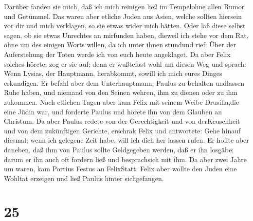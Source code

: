Darüber fanden sie mich, daß ich mich reinigen ließ im Tempelohne allen
Rumor und Getümmel.  Das waren aber etliche Juden aus
Asien, welche sollten hiersein vor dir und mich verklagen, so sie etwas
wider mich hätten.  Oder laß diese selbst sagen, ob sie
etwas Unrechtes an mirfunden haben, dieweil ich stehe vor dem Rat,
 ohne um des einigen Worts willen, da ich unter ihnen
stundund rief: Über der Auferstehung der Toten werde ich von euch heute
angeklaget.  Da aber Felix solches hörete; zog er sie auf;
denn er wußtefast wohl um diesen Weg und sprach: Wenn Lysias, der
Hauptmann, herabkommt, sowill ich mich eures Dinges erkundigen.
 Er befahl aber dem Unterhauptmann, Paulus zu behalten
undlassen Ruhe haben, und niemand von den Seinen wehren, ihm zu dienen
oder zu ihm zukommen.  Nach etlichen Tagen aber kam Felix
mit seinem Weibe Drusilla,die eine Jüdin war, und forderte Paulus und
hörete ihn von dem Glauben an Christum.  Da aber Paulus
redete von der Gerechtigkeit und von derKeuschheit und von dem
zukünftigen Gerichte, erschrak Felix und antwortete: Gehe hinauf
diesmal; wenn ich gelegene Zeit habe, will ich dich her lassen rufen.
 Er hoffte aber daneben, daß ihm von Paulus sollte
Geldgegeben werden, daß er ihn losgäbe; darum er ihn auch oft fordern
ließ und besprachsich mit ihm.  Da aber zwei Jahre um
waren, kam Portius Festus an FelixStatt. Felix aber wollte den Juden
eine Wohltat erzeigen und ließ Paulus hinter sichgefangen.

\hypertarget{section-24}{%
\section{25}\label{section-24}}

